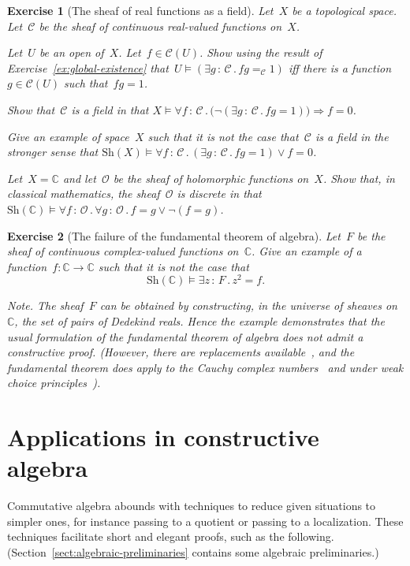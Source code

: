 \documentclass{ws-rv9x6}
\newtheorem{ex}{Exercise}
\newenvironment{exercise}[1]{
  \begin{ex}[#1]
}{\end{ex}}
\newcommand{\C}{\mathcal{C}}
\renewcommand{\O}{\mathcal{O}}
\newcommand{\CC}{\mathbb{C}}
\newcommand{\Sh}{\mathrm{Sh}}
\renewcommand{\_}{\mathpunct{.}}
\newcommand{\?}{\,{:}\,}
\begin{document}
\begin{exercise}{The sheaf of real functions as a field}%
Let~$X$ be a topological space. Let~$\C$ be the sheaf of continuous real-valued
functions on~$X$.
\begin{alphlist}[(d)]
\item Let~$U$ be an open of~$X$. Let~$f \in \C(U)$. Show using the result
of Exercise~\ref{ex:global-existence} that~$U \models (\exists g\?\C\_ fg =_\C
1)$ iff there is a function~$g \in \C(U)$ such that~$fg = 1$.
\item Show that~$\C$ is a field in that
$X \models \forall f\?\C\_
  \bigl(\neg(\exists g\?\C\_ fg = 1)\bigr) \Rightarrow f = 0$.
\item Give an example of space~$X$ such that it is not the case that~$\C$ is a
field in the stronger sense that
$\Sh(X) \models \forall f\?\C\_ (\exists g\?\C\_ fg = 1) \vee f = 0$.
\item Let~$X = \CC$ and let~$\O$ be the sheaf of holomorphic functions on~$X$.
Show that, in classical mathematics, the sheaf~$\O$ is \emph{discrete} in that
$\Sh(\CC) \models \forall f\?\O\_ \forall g\?\O\_ f = g \vee \neg(f = g)$.
\end{alphlist}
\end{exercise}

\begin{exercise}{The failure of the fundamental theorem of algebra}%
\label{ex:fta}%
Let~$F$ be the sheaf of continuous complex-valued functions on~$\CC$. Give an
example of a function~$f : \CC \to \CC$ such that it is not the case that
\[ \Sh(\CC) \models \exists z\?F\_ z^2 = f. \]
{\scriptsize\emph{Note.} The sheaf~$F$ can be obtained by constructing, in the
universe of sheaves on~$\CC$, the set of pairs of Dedekind reals. Hence the
example demonstrates that the usual formulation of the fundamental theorem of
algebra does not admit a constructive proof. (However, there are replacements
available~\cite{richman:fta}, and the fundamental theorem does apply to the
Cauchy complex numbers~\cite{ruitenburg:roots} and under weak choice
principles~\cite{bridges-richman-schuster:wcc}).\par}
\end{exercise}


\section{Applications in constructive algebra}
\label{sect:appl}

Commutative algebra abounds with techniques to reduce given situations to
simpler ones, for instance passing to a quotient or passing to a
localization. These techniques facilitate short and elegant proofs, such as the
following. (Section~\ref{sect:algebraic-preliminaries} contains some algebraic
preliminaries.)
\end{document}
